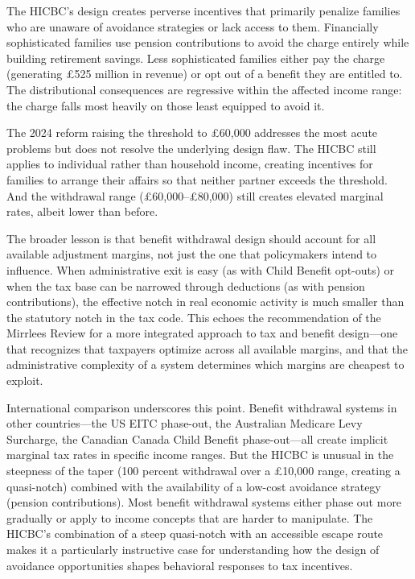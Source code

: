 \documentclass[12pt]{article}
\begin{document}
The HICBC's design creates perverse incentives that primarily penalize families who are unaware of avoidance strategies or lack access to them. Financially sophisticated families use pension contributions to avoid the charge entirely while building retirement savings. Less sophisticated families either pay the charge (generating \pounds525 million in revenue) or opt out of a benefit they are entitled to. The distributional consequences are regressive within the affected income range: the charge falls most heavily on those least equipped to avoid it.

The 2024 reform raising the threshold to \pounds60,000 addresses the most acute problems but does not resolve the underlying design flaw. The HICBC still applies to individual rather than household income, creating incentives for families to arrange their affairs so that neither partner exceeds the threshold. And the withdrawal range (\pounds60,000--\pounds80,000) still creates elevated marginal rates, albeit lower than before.

The broader lesson is that benefit withdrawal design should account for all available adjustment margins, not just the one that policymakers intend to influence. When administrative exit is easy (as with Child Benefit opt-outs) or when the tax base can be narrowed through deductions (as with pension contributions), the effective notch in real economic activity is much smaller than the statutory notch in the tax code. This echoes the recommendation of the Mirrlees Review \citep{mirrlees2011} for a more integrated approach to tax and benefit design---one that recognizes that taxpayers optimize across all available margins, and that the administrative complexity of a system determines which margins are cheapest to exploit.

International comparison underscores this point. Benefit withdrawal systems in other countries---the US EITC phase-out, the Australian Medicare Levy Surcharge, the Canadian Canada Child Benefit phase-out---all create implicit marginal tax rates in specific income ranges. But the HICBC is unusual in the steepness of the taper (100 percent withdrawal over a \pounds10,000 range, creating a quasi-notch) combined with the availability of a low-cost avoidance strategy (pension contributions). Most benefit withdrawal systems either phase out more gradually or apply to income concepts that are harder to manipulate. The HICBC's combination of a steep quasi-notch with an accessible escape route makes it a particularly instructive case for understanding how the design of avoidance opportunities shapes behavioral responses to tax incentives.
\end{document}
